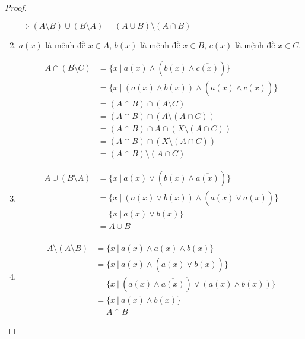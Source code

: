 \documentclass[class=linearalgebra,crop=false]{standalone}
\begin{document}
\begin{proof}
\begin{enumerate}[label = (\alph*)]
        \par $\Rightarrow (A\setminus B)\cup (B\setminus A) = (A\cup B)\setminus (A\cap B)$

        \item $a(x)$ là mệnh đề $x \in A$, $b(x)$ là mệnh đề $x\in B$, $c(x)$ là mệnh đề $x\in C$.

        \begin{align*}
            A\cap (B\setminus C) &= \{ x\ |\ a(x) \wedge (b(x) \wedge \overline{c(x)}) \} \\
                                 &= \{ x\ |\ (a(x) \wedge b(x)) \wedge (a(x) \wedge\overline{c(x)}) \} \\
                                 &= (A\cap B) \cap (A\setminus C) \\
                                 &= (A\cap B) \cap (A\setminus (A\cap C)) \\
                                 &= (A\cap B) \cap A \cap (X \setminus (A\cap C)) \\
                                 &= (A\cap B) \cap (X \setminus (A\cap C)) \\
                                 &= (A\cap B) \setminus (A\cap C)
        \end{align*}

        \item

        \begin{align*}
            A\cup (B\setminus A) &= \{ x\ |\ a(x) \vee (b(x) \wedge \overline{a(x)}) \} \\
                                 &= \{ x\ |\ (a(x) \vee b(x)) \wedge (a(x) \vee \overline{a(x)}) \} \\
                                 &= \{ x\ |\ a(x)\vee b(x) \} \\
                                 &= A\cup B
        \end{align*}

        \item

        \begin{align*}
            A\setminus (A\setminus B)&= \{ x\ |\ a(x) \wedge \overline{a(x)\wedge \overline{b(x)}} \} \\
                                     &= \{ x\ |\ a(x) \wedge (\overline{a(x)} \vee b(x)) \} \\
                                     &= \{ x\ |\ (a(x) \wedge \overline{a(x)}) \vee (a(x) \wedge b(x)) \} \\
                                     &= \{ x\ |\ a(x) \wedge b(x) \} \\
                                     &= A\cap B
        \end{align*}
    \end{enumerate}
\end{proof}
\end{document}
